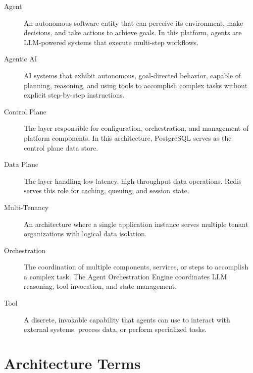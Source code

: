 \documentclass[a4paper,twoside]{sapthesis}
\begin{document}
\begin{description}

\item[Agent]
An autonomous software entity that can perceive its environment, make decisions, and take actions to achieve goals. In this platform, agents are LLM-powered systems that execute multi-step workflows.

\item[Agentic AI]
AI systems that exhibit autonomous, goal-directed behavior, capable of planning, reasoning, and using tools to accomplish complex tasks without explicit step-by-step instructions.

\item[Control Plane]
The layer responsible for configuration, orchestration, and management of platform components. In this architecture, PostgreSQL serves as the control plane data store.

\item[Data Plane]
The layer handling low-latency, high-throughput data operations. Redis serves this role for caching, queuing, and session state.

\item[Multi-Tenancy]
An architecture where a single application instance serves multiple tenant organizations with logical data isolation.

\item[Orchestration]
The coordination of multiple components, services, or steps to accomplish a complex task. The Agent Orchestration Engine coordinates LLM reasoning, tool invocation, and state management.

\item[Tool]
A discrete, invokable capability that agents can use to interact with external systems, process data, or perform specialized tasks.

\end{description}

\section{Architecture Terms}
\label{app:glossary:architecture}
\end{document}
